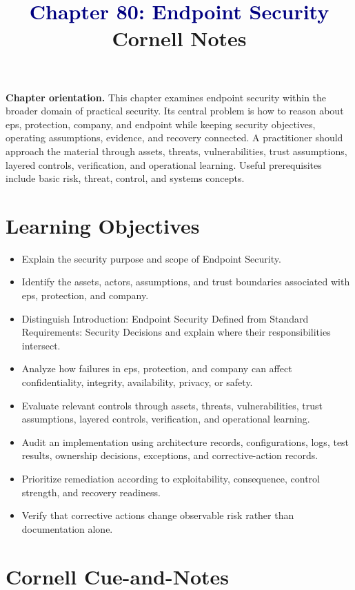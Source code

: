\documentclass[11pt]{article}
\title{\textcolor{Navy}{Chapter 80: Endpoint Security}\\[2mm]\large Cornell Notes}
\author{}
\date{}
\begin{document}
\maketitle
\thispagestyle{fancy}
\vspace{-1.5em}
\begin{orientationbox}
\textbf{Chapter orientation.} This chapter examines endpoint security within the broader domain of practical security. Its central problem is how to reason about eps, protection, company, and endpoint while keeping security objectives, operating assumptions, evidence, and recovery connected. A practitioner should approach the material through assets, threats, vulnerabilities, trust assumptions, layered controls, verification, and operational learning. Useful prerequisites include basic risk, threat, control, and systems concepts.
\end{orientationbox}
\section*{Learning Objectives}
\begin{itemize}
\item Explain the security purpose and scope of Endpoint Security.
\item Identify the assets, actors, assumptions, and trust boundaries associated with eps, protection, and company.
\item Distinguish Introduction: Endpoint Security Defined from Standard Requirements: Security Decisions and explain where their responsibilities intersect.
\item Analyze how failures in eps, protection, and company can affect confidentiality, integrity, availability, privacy, or safety.
\item Evaluate relevant controls through assets, threats, vulnerabilities, trust assumptions, layered controls, verification, and operational learning.
\item Audit an implementation using architecture records, configurations, logs, test results, ownership decisions, exceptions, and corrective-action records.
\item Prioritize remediation according to exploitability, consequence, control strength, and recovery readiness.
\item Verify that corrective actions change observable risk rather than documentation alone.
\end{itemize}
\section*{Cornell Cue-and-Notes}
\end{document}
